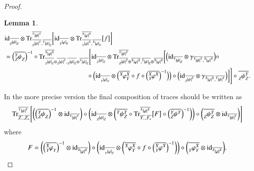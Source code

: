 \documentclass{amsart}
\def\tn{\textnormal}
\def\Trace{\tn{Tr}}
\def\ol{\overline}
\def\id{\tn{id}}
\newcommand{\inp}[1]{{#1_-}}
\newcommand{\outp}[1]{{#1_+}}
\newcommand{\feeddd}[3]{{\tensor*[^{#2}_{\color{white}{!}}]{{|#1|}}{^{#3}}}}%
\newcommand{\feeddc}[3]{{\tensor*[^{#2}]{{|#1|}}{_{#3}}}}
\newcommand{\feedcd}[3]{{\tensor*[_{#2}]{{|#1|}}{^{#3}}}}
\newcommand{\feedcc}[3]{{\tensor*[^{\color{white}{!}}_{#2}]{{|#1|}}{_{#3}}}}
\newcommand{\feedda}[3]{{\tensor*[^{#2}_{\color{white}{!}}]{{#1}}{^{#2}_{#3}}}}
\newcommand{\feedca}[3]{{\tensor*[_{#2}]{{#1}}{_{#2}^{#3}}}}
\newcommand{\feedad}[3]{{\tensor*[^{#2}_{#3}]{{#1}}{^{#2}}}}
\newcommand{\feedac}[3]{{\tensor*[_{#2}^{#3}]{{#1}}{_{#2}}}}
\newtheorem{lemma}[subsubsection]{Lemma}
\theoremstyle{remark}
\theoremstyle{definition}
\begin{document}
\begin{proof}
\begin{lemma}\label{le:combining traces}
 \begin{align*}
&\id_{\ol{\feedcc{\psi}{Z}{Z}}}\otimes\Trace^{\ol{\feeddd{\psi}{Y}{Y}}}_{\ol{\feedcd{\psi}{Z}{Y}},\ol{\feeddc{\psi}{Y}{Z}}}
\bigg[
\id_{\ol{\feedcc{\varphi}{Y}{Y}}}\otimes\Trace^{\ol{\feeddd{\varphi}{X}{X}}}_{\ol{\feedcd{\varphi}{Y}{X}},\ol{\feeddc{\varphi}{X}{Y}}}\big[f\big]
\bigg]\\
&=\Big(\ol{\feedac{\psi}{Z}{Y}}\Big)^{-1}\circ\Trace^{\ol{\feeddd{\varphi}{X}{X}}}_{\ol{\feedcc{\psi}{Z}{Z}}\otimes\ol{\feedcd{\psi}{Z}{Y}},\ol{\feedcc{\psi}{Z}{Z}}\otimes\ol{\feeddc{\psi}{Y}{Z}}}
\Bigg[
\id_{\ol{\feedcc{\psi}{Z}{Z}}}\otimes\Trace^{\ol{\feeddd{\psi}{Y}{Y}}}_{\ol{\feedcd{\psi}{Z}{Y}}\otimes\ol{\feeddd{\varphi}{X}{X}},\ol{\feeddc{\psi}{Y}{Z}}\otimes\ol{\feeddd{\varphi}{X}{X}}}
\bigg[
\Big(\id_{\ol{\feeddc{\psi}{Y}{Z}}}\otimes\gamma_{\ol{\feeddd{\psi}{Y}{Y}},\ol{\feeddd{\varphi}{X}{X}}}\Big)\circ\\
&\hspace{1.75in}\circ\Big(\id_{\ol{\feedcc{\varphi}{Y}{Y}}}\otimes \Big(\ol{\feedda{\varphi}{X}{Y}}\circ f\circ\Big(\ol{\feedad{\varphi}{X}{Y}}\Big)^{-1}\Big)\Big)\circ\Big(\id_{\ol{\feedcd{\psi}{Z}{Y}}}\otimes\gamma_{\ol{\feeddd{\varphi}{X}{X}},\ol{\feeddd{\psi}{Y}{Y}}}\Big)
\bigg]
\Bigg]\circ\ol{\feedca{\psi}{Z}{Y}}.
\end{align*}
\end{lemma}
In the more precise version the final composition of traces should be written as
\begin{align*}
\Trace^{\ol{\feeddd{\psi}{Y}{Y}}}_{\ol{Z_-},\ol{Z_+}}
\Bigg[\bigg(\Big(\ol{\feedac{\psi}{Z}{Y}}\Big)^{-1}\otimes \id_{\ol{\feeddd{\psi}{Y}{Y}}}\bigg)\circ\bigg(\id_{\ol{\feedcc{\psi}{Z}{Z}}}\otimes\bigg(\ol{\feedda{\psi}{Y}{Z}}\circ\Trace^{\ol{\feeddd{\varphi}{X}{X}}}_{\ol{\inp{Y}},\ol{\outp{Y}}}\big[F\big]\circ\Big(\ol{\feedad{\psi}{Y}{Z}}\Big)^{-1}\bigg)\bigg)\circ\bigg(\ol{\feedca{\psi}{Z}{Y}}\otimes \id_{\ol{\feeddd{\psi}{Y}{Y}}}\bigg)\Bigg]
\end{align*}
where
\[F=\bigg(\Big(\ol{\feedac{\varphi}{Y}{X}}\Big)^{-1}\otimes\id_{\ol{\feeddd{\varphi}{X}{X}}}\bigg)\circ\bigg(\id_{\ol{\feedcc{\varphi}{Y}{Y}}}\otimes \bigg(\ol{\feedda{\varphi}{X}{Y}}\circ f\circ\Big(\ol{\feedad{\varphi}{X}{Y}}\Big)^{-1}\bigg)\bigg)\circ\bigg(\ol{\feedca{\varphi}{Y}{X}}\otimes\id_{\ol{\feeddd{\varphi}{X}{X}}}\bigg).\]


\end{proof}
\end{document}
